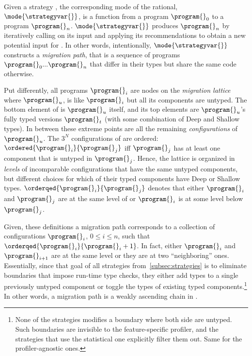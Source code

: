 Given a strategy \strategyvar{}, the corresponding mode of the rational, 
$\mode{\strategyvar{}}$, is a function from a program $\program{}_0$ to a
program $\program{}_n$. $\mode{\strategyvar{}}$ produces  $\program{}_n$
by iteratively calling \strategyvar{} on its input and applying its
recommendations to obtain a new potential input for \strategyvar{}. 
In other words, intentionally,  $\mode{\strategyvar{}}$ constructs a
\emph{migration path}, that is a sequence of programs 
${\program{}_0} ... {\program{}_n}$ that differ in their types but share
the same code otherwise.

Put differently, all programs $\program{}_i$ are nodes on the
\emph{migration lattice}  where ${\program{}_u}$, is
like ${\program{}_i}$ but all its components are untyped. The bottom
element of  is ${\program{}_u}$ itself, and its top
elements are ${\program{}_u}$'s fully typed versions $\program{}_t$ (with some
combination of Deep and Shallow types). In between these extreme points
are all the remaining \emph{configurations} of $\program{}_u$. The $3^N$
configurations of   are ordered:
$\ordered{\program{}_i}{\program{}_j}$ iff $\program{}_j$ has at least one
component that is untyped in $\program{}_j$. Hence, the lattice is
organized in \emph{levels} of incomparable configurations that have the same
untyped components, but different choices for which of their typed
components have Deep or Shallow types.
$\orderqed{\program{}_i}{\program{}_j}$ denotes that either $\program{}_i$
and $\program{}_j$ are at the same level of  or
$\program{}_i$ is at some level below $\program{}_j$.

Given, these definitions a migration path corresponds to a collection of
configurations  $\program{}_i$, $0 \leq  i \leq n$, such that
$\orderqed{\program{}_i}{\program{}_i+1}$. In fact, either  $\program{}_i$
and $\program{}_{i+1}$ are at the same level or they are at two
``neighboring'' ones.  Essentially, since that goal of all strategies
from~\ref{subsec:strategies} is to eliminate  boundaries that impose
run-time type checks, they either add types to a single previously
untyped component or toggle the types of existing typed
components.\footnote{None of the strategies modifies a boundary where both
side are untyped. Such boundaries are invisible to the feature-specific
profiler, and the strategies that use the statistical one explicitly
filter them out. Same for the profiler-agnostic ones.} 
In other words, a migration path is a weakly ascending
chain in .

